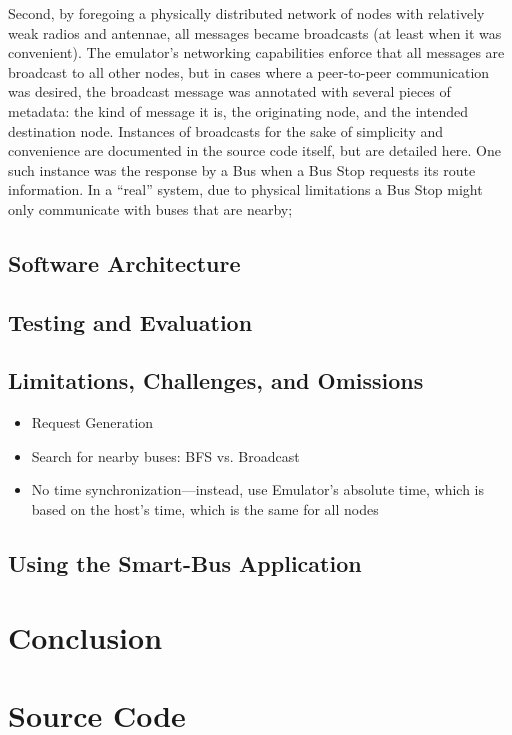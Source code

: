 \documentclass[runningheads]{llncs}
\begin{document}
Second, by foregoing a physically distributed network of nodes with relatively weak radios and antennae, all messages became broadcasts (at least when it was convenient). The emulator's networking capabilities enforce that all messages are broadcast to all other nodes, but in cases where a peer-to-peer communication was desired, the broadcast message was annotated with several pieces of metadata: the kind of message it is, the originating node, and the intended destination node. Instances of broadcasts for the sake of simplicity and convenience are documented in the source code itself, but are detailed here. One such instance was the response by a Bus when a Bus Stop requests its route information. In a ``real'' system, due to physical limitations a Bus Stop might only communicate with buses that are nearby;

\subsection{Software Architecture}
\subsection{Testing and Evaluation}
\subsection{Limitations, Challenges, and Omissions}
\begin{itemize}
  \item Request Generation
  \item Search for nearby buses: BFS vs. Broadcast
  \item No time synchronization---instead, use Emulator's absolute time, which is based on the host's time, which is the same for all nodes
\end{itemize}
\subsection{Using the Smart-Bus Application}

\section{Conclusion}

\newpage
\appendix
\section{Source Code}

% 
\end{document}
